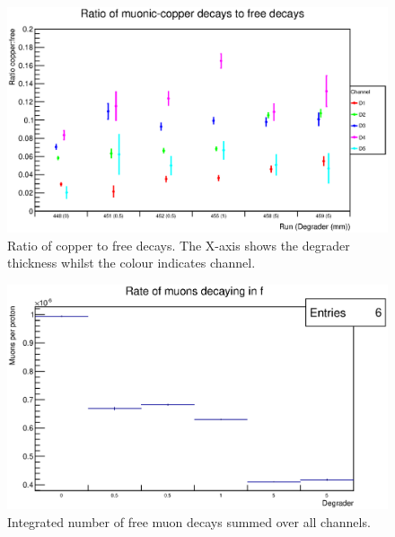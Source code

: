 \begin{figure}[hptb]
  \centering
    \includegraphics[width=.9\textwidth]{images/plot_generating_scripts/Ratio.eps}
  \caption{Ratio of copper to free decays. The X-axis shows the degrader thickness whilst the colour indicates channel.}
  \label{fig:images_plot_generating_scripts_Ratio}
\end{figure}

\begin{figure}[hptb]
  \centering
    \includegraphics[width=.9\textwidth]{images/momentum_spectrum/run_muon_rate_in_f.eps}
  \caption{Integrated number of free muon decays summed over all channels.}
  \label{fig:images_momentum_spectrum_run_muon_rate_in_f}
\end{figure}

